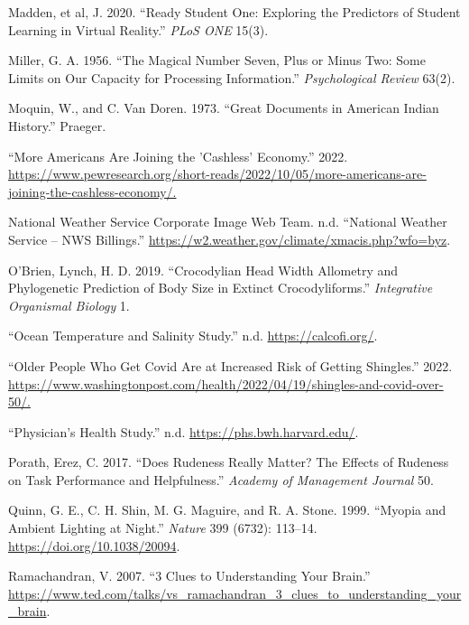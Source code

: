 \documentclass[
]{report}
\newlength{\cslhangindent}
\newenvironment{CSLReferences}[2] %
 {\begin{list}{}{%
  \setlength{\itemindent}{0pt}
  \setlength{\leftmargin}{0pt}
  \setlength{\parsep}{0pt}
  \ifodd #1
   \setlength{\leftmargin}{\cslhangindent}
   \setlength{\itemindent}{-1\cslhangindent}
  \fi
  \setlength{\itemsep}{#2\baselineskip}}}
 {\end{list}}
\begin{document}
\begin{CSLReferences}{1}{0}
Madden, et al, J. 2020. {``Ready Student One: Exploring the Predictors of Student Learning in Virtual Reality.''} \emph{PLoS ONE} 15(3).

Miller, G. A. 1956. {``The Magical Number Seven, Plus or Minus Two: Some Limits on Our Capacity for Processing Information.''} \emph{Psychological Review} 63(2).

Moquin, W., and C. Van Doren. 1973. {``Great Documents in American Indian History.''} Praeger.

{``More Americans Are Joining the 'Cashless' Economy.''} 2022. \url{https://www.pewresearch.org/short-reads/2022/10/05/more-americans-are-joining-the-cashless-economy/.}

National Weather Service Corporate Image Web Team. n.d. {``National Weather Service -- {NWS} Billings.''} \url{https://w2.weather.gov/climate/xmacis.php?wfo=byz}.

O'Brien, Lynch, H. D. 2019. {``Crocodylian Head Width Allometry and Phylogenetic Prediction of Body Size in Extinct Crocodyliforms.''} \emph{Integrative Organismal Biology} 1.

{``Ocean Temperature and Salinity Study.''} n.d. \url{https://calcofi.org/}.

{``Older People Who Get Covid Are at Increased Risk of Getting Shingles.''} 2022. \url{https://www.washingtonpost.com/health/2022/04/19/shingles-and-covid-over-50/.}

{``Physician's Health Study.''} n.d. \url{https://phs.bwh.harvard.edu/}.

Porath, Erez, C. 2017. {``Does Rudeness Really Matter? The Effects of Rudeness on Task Performance and Helpfulness.''} \emph{Academy of Management Journal} 50.

Quinn, G. E., C. H. Shin, M. G. Maguire, and R. A. Stone. 1999. {``Myopia and Ambient Lighting at Night.''} \emph{Nature} 399 (6732): 113--14. \url{https://doi.org/10.1038/20094}.

Ramachandran, V. 2007. {``3 Clues to Understanding Your Brain.''} \url{https://www.ted.com/talks/vs_ramachandran_3_clues_to_understanding_your_brain}.


\end{CSLReferences}
\end{document}
